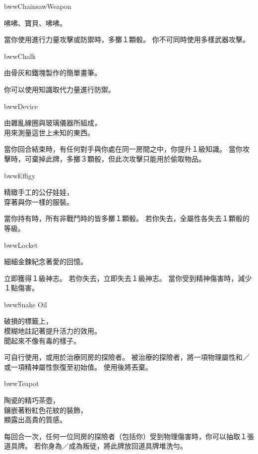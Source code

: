 \linebreak[0]%
\begin{ItemCard}{bww}{Chainsaw}{Weapon}
  \begin{CardStory}
    咈咈、寶貝、咈咈。
  \end{CardStory}
  當你使用\ThisName{}進行力量攻擊或防禦時，多擲１顆骰。\smallbreak
  你不可同時使用多樣武器攻擊。\smallbreak
\end{ItemCard}%
\linebreak[0]%
\begin{ItemCard}{bww}{Chalk}{}
  \begin{CardStory}
    由骨灰和鐵塊製作的簡單畫筆。
  \end{CardStory}
  你可以使用知識取代力量進行防禦。\smallbreak
\end{ItemCard}%
\linebreak[0]%
\begin{ItemCard}{bww}{Device}{}
  \begin{CardStory}
    由雜亂線圈與玻璃儀器所組成，\\
    用來測量這世上未知的東西。
  \end{CardStory}
  當你回合結束時，有任何對手與你處在同一房間之中，你提升１級知識。\smallbreak
  當你攻擊時，可棄掉此牌，多擲３顆骰，但此次攻擊只能用於偷取物品。\smallbreak
\end{ItemCard}%
\linebreak[0]%
\begin{ItemCard}{bww}{Effigy}{}
  \begin{CardStory}
    精緻手工的公仔娃娃，\\
    穿著與你一樣的服裝。
  \end{CardStory}
  當你持有\ThisName{}時，所有非戰鬥時的皆多擲１顆骰。\smallbreak
  若你失去\ThisName{}，全屬性各失去１顆骰的等級。\smallbreak
\end{ItemCard}%
\linebreak[0]%
\begin{ItemCard}{bww}{Locket}{}
  \begin{CardStory}
    細細金鍊紀念著愛的回憶。
  \end{CardStory}
  立即獲得１級神志。\smallbreak
  若你失去\ThisName{}，立即失去１級神志。\smallbreak
  當你受到精神傷害時，減少１點傷害。\smallbreak
\end{ItemCard}%
\linebreak[0]%
\begin{ItemCard}{bww}{Snake Oil}{}
  \begin{CardStory}
    破損的標籤上，\\
    模糊地註記著提升活力的效用。\\
    聞起來不像有毒的樣子。
  \end{CardStory}
  可自行使用，或用於治療同房的探險者。\smallbreak
  被\ThisName{}治療的探險者，將一項物理屬性和／或一項精神屬性恢復至初始值。\smallbreak
  使用後將\ThisName{}丟棄。\smallbreak
\end{ItemCard}%
\linebreak[0]%
\begin{ItemCard}{bww}{Teapot}{}
  \begin{CardStory}
    陶瓷的精巧茶壺，\\
    鑲嵌著粉紅色花紋的裝飾，\\
    顯露出高貴的質感。
  \end{CardStory}
  每回合一次，任何一位同房的探險者（包括你）受到物理傷害時，你可以抽取１張道具牌。\smallbreak
  若你身為／成為叛徒，將此牌放回道具牌堆洗勻。\smallbreak
\end{ItemCard}%
\linebreak[0]%
